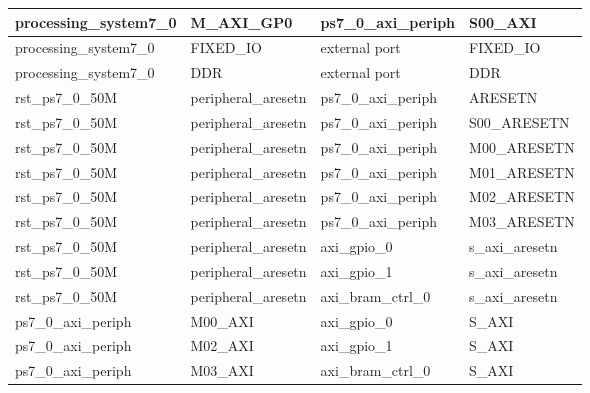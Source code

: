 \begin{table}[!ht]
\begin{tabular}{|l|l|l|l|}
        processing\_system7\_0  & M\_AXI\_GP0           & ps7\_0\_axi\_periph       & S00\_AXI \\ \hline
        processing\_system7\_0  & FIXED\_IO             & external port             & FIXED\_IO \\ \hline
        processing\_system7\_0  & DDR                   & external port             & DDR \\ \hline
        rst\_ps7\_0\_50M        & peripheral\_aresetn   & ps7\_0\_axi\_periph       & ARESETN \\ \hline
        rst\_ps7\_0\_50M        & peripheral\_aresetn   & ps7\_0\_axi\_periph       & S00\_ARESETN \\ \hline
        rst\_ps7\_0\_50M        & peripheral\_aresetn   & ps7\_0\_axi\_periph       & M00\_ARESETN \\ \hline
        rst\_ps7\_0\_50M        & peripheral\_aresetn   & ps7\_0\_axi\_periph       & M01\_ARESETN \\ \hline
        rst\_ps7\_0\_50M        & peripheral\_aresetn   & ps7\_0\_axi\_periph       & M02\_ARESETN \\ \hline
        rst\_ps7\_0\_50M        & peripheral\_aresetn   & ps7\_0\_axi\_periph       & M03\_ARESETN \\ \hline
        rst\_ps7\_0\_50M        & peripheral\_aresetn   & axi\_gpio\_0              & s\_axi\_aresetn \\ \hline
        rst\_ps7\_0\_50M        & peripheral\_aresetn   & axi\_gpio\_1              & s\_axi\_aresetn \\ \hline
        rst\_ps7\_0\_50M        & peripheral\_aresetn   & axi\_bram\_ctrl\_0        & s\_axi\_aresetn \\ \hline
        ps7\_0\_axi\_periph     & M00\_AXI              & axi\_gpio\_0              & S\_AXI \\ \hline
        ps7\_0\_axi\_periph     & M02\_AXI              & axi\_gpio\_1              & S\_AXI \\ \hline
        ps7\_0\_axi\_periph     & M03\_AXI              & axi\_bram\_ctrl\_0        & S\_AXI \\ \hline
    \end{tabular}
\end{table}

